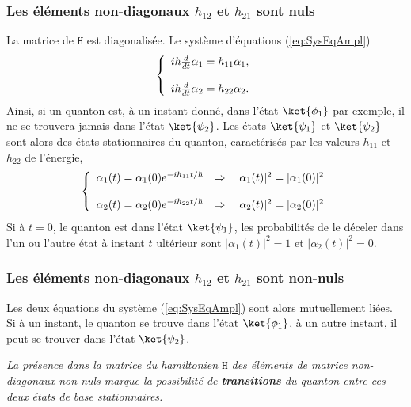 \subsubsection{Les éléments non-diagonaux $h_{12}$ et $h_{21}$ sont nuls}

La matrice de $\mathtt{H}$ est diagonalisée. Le système d'équations
(\ref{eq:SysEqAmpl})%
\begin{equation}
\left\{
\begin{array}
[c]{c}%
i\hbar\frac{d}{dt}\alpha_1=h_{11}\alpha_1,\\
\\
i\hbar\frac{d}{dt}\alpha_2=h_{22}\alpha_2.
\end{array}
\right.
\end{equation}
Ainsi, si un quanton est, à un instant donné, dans l'état $\ket{\phi_1}$ par
exemple, il ne se trouvera jamais dans l'état $\ket{\psi_2}$. Les états
$\ket{\psi_1} $ et $\ket{\psi_2}$ sont alors des états stationnaires du
quanton, caractérisés par les valeurs $h_{11}$ et $h_{22}$ de l'énergie,%
\begin{equation}
\left\{
\begin{array}
[c]{ccc}%
\alpha_1(t)=\alpha_1(0)e^{-ih_{11}t/\hbar} & \Rightarrow &
|\alpha_1(t)|^{2}=|\alpha_1(0)|^{2}\\
&  & \\
\alpha_2(t)=\alpha_2(0)e^{-ih_{22}t/\hbar} & \Rightarrow &
|\alpha_2(t)|^{2}=|\alpha_2(0)|^{2}%
\end{array}
\right.
\end{equation}
Si à $t=0$, le quanton est dans l'état $\ket{\psi_1} $,
les probabilités de le déceler dans l'un ou l'autre état à instant $t$
ultérieur sont $|\alpha_1(t)|^{2}=1$ et $|\alpha_2(t)|^{2}=0$.

\subsubsection{Les éléments non-diagonaux $h_{12}$ et $h_{21}$ sont non-nuls}

Les deux équations du système (\ref{eq:SysEqAmpl}) sont alors mutuellement
liées. Si à un instant, le quanton se trouve dans l'état $\ket{\phi_1}$, à un
autre instant, il peut se trouver dans l'état $\ket{\psi_2}$.

\medskip
\colorbox[gray]{0.8}{
\parbox[c]{0.9\textwidth}{
\emph{La présence dans la matrice du hamiltonien $\mathtt{H}$ des éléments de
matrice
non-diagonaux non nuls marque la possibilité de \textbf{transitions} du quanton
entre ces deux états de base stationnaires.}
}}

